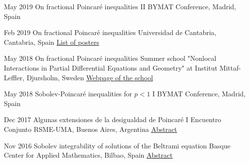     \begin{poster}{May 2019}
    {On fractional Poincar\'e inequalities}
    {II BYMAT Conference, Madrid, Spain}
    {}
  \end{poster}
      
    \begin{poster}
    {Feb 2019}
    {On fractional Poincar\'e inequalities}
    {Universidad de Cantabria, Cantabria, Spain}
      {\href{https://2019.bienalrsme.com/sites/default/files/Listado-Resumenes-Posteres-BienalRSME2019.pdf}{ \underline{List of posters}}\\}
  \end{poster}
 
      
    \begin{talk}
    {May 2018}
    {On fractional Poincar\'e inequalities}
    {Summer school "Nonlocal Interactions in Partial Differential Equations and Geometry" at Institut Mittaf-Leffler, Djursholm, Sweden}
    { \href{http://www.mittag-leffler.se/sommarskola/nonlocal-interactions-partial-differential-equations-and-geometry}{\underline{Webpage of the school}}\\}
  \end{talk}


    \begin{talk}    
        {May 2018}
        {Sobolev-Poincar\'e inequalities for $p<1$}
        {I BYMAT Conference, Madrid, Spain}
        { } 
  \end{talk}
  
      
      
    \begin{talk}
        {Dec 2017}
        {Algunas extensiones de la desigualdad de Poincar\'e}
        {I Encuentro Conjunto RSME-UMA, Buenos Aires, Argentina}
        {\href{http://uma2017.dm.uba.ar/index.php/resumen?code=9979}{ \underline{Abstract}}\\}
  \end{talk}

      
      
      
    \begin{talk}
        {Nov 2016}
        {Sobolev integrability of solutions of the Beltrami equation}
        {Basque Center for Applied Mathematics, Bilbao, Spain}
        {\href{http://www.bcamath.org/documentos_public/archivos/actividades/BCAMWorkingSeminarHA20161130JMP.pdf}{\underline{Abstract}\\}}
  \end{talk}